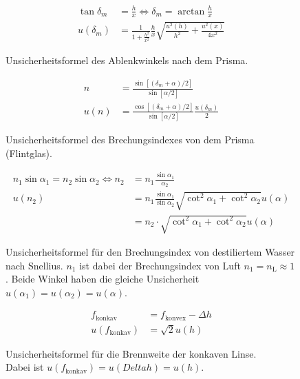 \begin{figure}[ht]
	\begin{align*}
		\tan \delta_m &= \frac{h}{x} \Leftrightarrow \delta_m = \arctan \frac{h}{x}\\
		u(\delta_m) &= \frac{1}{1 + \frac{h^2}{x^2}} \frac{h}{x} 
		\sqrt{\frac{u^2(h)}{h^2} + \frac{u^2(x)}{4x^2}}
	\end{align*}
	\caption{Unsicherheitsformel des Ablenkwinkels nach dem Prisma.}
	\label{unc:winkel}
\end{figure}

\begin{figure}[ht]
	\begin{align*}
		n &= \frac{\sin[(\delta_m + \alpha) / 2]}{\sin [\alpha / 2]}\\
		u(n) &= \frac{\cos[(\delta_m + \alpha) / 2]}{\sin[\alpha / 2]} \frac{u(\delta_m)}{2}
	\end{align*}
	\caption{Unsicherheitsformel des Brechungsindexes von dem Prisma (Flintglas).}
	\label{unc:prisma}
\end{figure}

\begin{figure}[ht]
	\begin{align*}
		n_1 \sin \alpha_1 = n_2 \sin \alpha_2 \Leftrightarrow n_2 &= n_1 \frac{\sin \alpha_1}{\alpha_2}\\
		u(n_2) &= n_1 \frac{\sin \alpha_1}{\sin \alpha_2} \sqrt{\cot^2 \alpha_1 + \cot^2 \alpha_2} u(\alpha)\\
		&= n_2 \cdot \sqrt{\cot^2 \alpha_1 + \cot^2 \alpha_2} u(\alpha)
	\end{align*}
	\caption{Unsicherheitsformel für den Brechungsindex von destiliertem Wasser nach Snellius. $n_1$ ist dabei der Brechungsindex von Luft $n_1 = n_\text{L} \approx 1$. Beide Winkel haben die gleiche Unsicherheit $u(\alpha_1) = u(\alpha_2) = u(\alpha)$.}
	\label{unc:gitter}
\end{figure}

\begin{figure}[ht]
	\begin{align*}
		f_\text{konkav} &= f_\text{konvex} - \Delta h\\
		u(f_\text{konkav}) &= \sqrt{2} u(h)
	\end{align*}
	\caption{Unsicherheitsformel für die Brennweite der konkaven Linse.\\ Dabei ist $u(f_\text{konkav}) = u(Delta h) = u(h)$.}
	\label{unc:differenz}
\end{figure}
